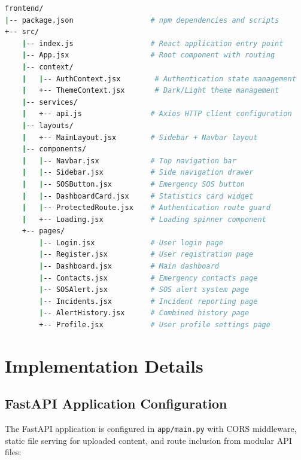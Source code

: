 \begin{lstlisting}[caption=Frontend project structure, label=lst:frontend-structure, language=bash, frame=none]
frontend/
|-- package.json                  # npm dependencies and scripts
+-- src/
    |-- index.js                  # React application entry point
    |-- App.jsx                   # Root component with routing
    |-- context/
    |   |-- AuthContext.jsx        # Authentication state management
    |   +-- ThemeContext.jsx       # Dark/Light theme management
    |-- services/
    |   +-- api.js                # Axios HTTP client configuration
    |-- layouts/
    |   +-- MainLayout.jsx        # Sidebar + Navbar layout
    |-- components/
    |   |-- Navbar.jsx            # Top navigation bar
    |   |-- Sidebar.jsx           # Side navigation drawer
    |   |-- SOSButton.jsx         # Emergency SOS button
    |   |-- DashboardCard.jsx     # Statistics card widget
    |   |-- ProtectedRoute.jsx    # Authentication route guard
    |   +-- Loading.jsx           # Loading spinner component
    +-- pages/
        |-- Login.jsx             # User login page
        |-- Register.jsx          # User registration page
        |-- Dashboard.jsx         # Main dashboard
        |-- Contacts.jsx          # Emergency contacts page
        |-- SOSAlert.jsx          # SOS alert system page
        |-- Incidents.jsx         # Incident reporting page
        |-- AlertHistory.jsx      # Combined history page
        +-- Profile.jsx           # User profile settings page
\end{lstlisting}

\section{Implementation Details}

\subsection{FastAPI Application Configuration}

The FastAPI application is configured in \texttt{app/main.py} with CORS middleware, static file serving for uploaded content, and route inclusion from modular API files:

